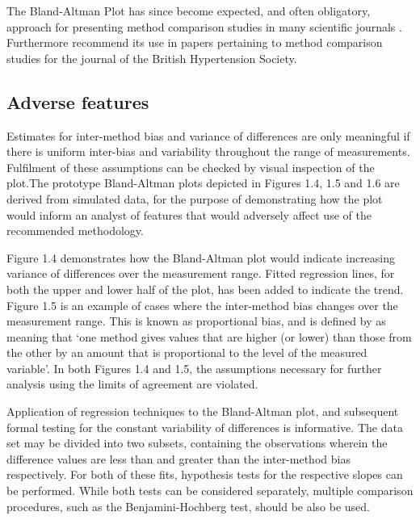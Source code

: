 \documentclass[Chap2main.tex]{subfiles}
\begin{document}
The Bland-Altman Plot has since become expected, and
often obligatory, approach for presenting method comparison studies in many scientific journals \citep{hollis}. Furthermore \citet{BritHypSoc} recommend its use in papers pertaining to
method comparison studies for the journal of the British Hypertension Society.

\subsection{Adverse features}

Estimates for inter-method bias and variance of differences are only meaningful if there is uniform inter-bias and variability throughout the range of measurements. Fulfilment of these assumptions can be checked by visual inspection of the plot.The prototype Bland-Altman plots depicted in Figures 1.4, 1.5 and 1.6 are derived from simulated data, for the purpose of demonstrating how the plot would inform an analyst of features that would adversely affect use of the recommended methodology.

Figure 1.4 demonstrates how the Bland-Altman plot would indicate increasing variance of differences over the measurement range. Fitted regression lines, for both the upper and lower half of the plot, has been added to indicate the trend. Figure 1.5 is an example of cases where the inter-method bias changes over the measurement range. This is known as proportional bias, and is defined by \citet{ludbrook97} as meaning that `one method gives values that are higher (or lower) than those from the other by an amount that is proportional to the level of the measured variable'. In both Figures 1.4 and 1.5, the assumptions necessary for further analysis using the limits of agreement are violated.

Application of regression techniques to the Bland-Altman plot, and subsequent formal testing for the constant variability of
differences is informative. The data set may be divided into two subsets, containing the observations wherein the difference values
are less than and greater than the inter-method bias respectively.
For both of these fits, hypothesis tests for the respective slopes
can be performed. While both tests can be considered separately,
multiple comparison procedures, such as the Benjamini-Hochberg
\citep{BH} test, should be also be used.
\end{document}
